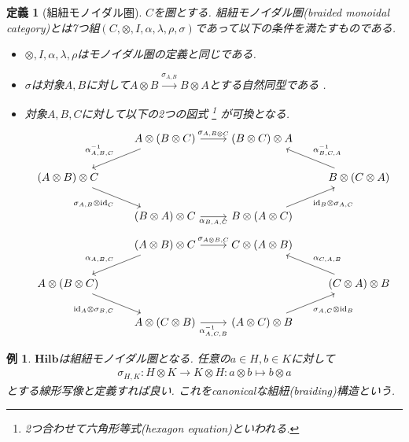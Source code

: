 \documentclass[a4paper,12pt]{ltjsarticle}
\theoremstyle{break}
\newtheorem{defn}[thm]{定義}
\newtheorem{eg}[thm]{例}
\newcommand{\hilb}{\mathbf{Hilb}}
\newcommand{\xr}[1]{\xrightarrow{#1}}
\newcommand{\id}{\mathrm{id}}
\newcommand{\al}{\alpha}
\newcommand{\la}{\lambda}
\newcommand{\si}{\sigma}
\newcommand{\mt}{\mapsto}
\newcommand{\ot}{\otimes}
\numberwithin{equation}{section}
\begin{document}
\begin{defn}[組紐モノイダル圏]
  $C$を圏とする. 組紐モノイダル圏(braided monoidal category)とは7つ組$(C,\ot,I,\al,\la,\rho,\si)$であって以下の条件を満たすものである. 
  \begin{itemize}
    \item $\ot,I,\al,\la,\rho$はモノイダル圏の定義と同じである. 
    \item $\si$は対象$A,B$に対して$A \ot B \xr{\si_{A,B}} B \ot A$とする自然同型である . 
    \item 対象$A,B,C$に対して以下の2つの図式
    \footnote{
      2つ合わせて六角形等式(hexagon equation)といわれる. 
    }
    が可換となる.
    \[\begin{tikzcd}
      & {A \ot (B \ot C)} & {(B \ot C)\ot A} \\
      {(A \ot B) \ot C} &&& {B \ot (C \ot A)} \\
      & {(B \ot A) \ot C} & {B \ot (A \ot C)}
      \arrow["{\al_{A,B,C}^{-1}}"', from=1-2, to=2-1]
      \arrow["{\si_{A,B \ot C}}", from=1-2, to=1-3]
      \arrow["{\al_{B,C,A}^{-1}}"', from=2-4, to=1-3]
      \arrow["{\id_{B} \ot \si_{A,C}}"', from=3-3, to=2-4]
      \arrow["{\si_{A,B} \ot \id_C}"', from=2-1, to=3-2]
      \arrow["{\al_{B,A,C}}"', from=3-2, to=3-3]
    \end{tikzcd}\]
    \[\begin{tikzcd}
      & {(A \ot B) \ot C} & {C \ot (A \ot B)} \\
      {A \ot (B \ot C)} &&& {(C \ot A) \ot B} \\
      & {A \ot (C \ot B)} & {(A \ot C) \ot B}
      \arrow["{\al_{A,B,C}}"', from=1-2, to=2-1]
      \arrow["{\si_{A \ot B, C}}", from=1-2, to=1-3]
      \arrow["{\al_{C,A,B}}"', from=2-4, to=1-3]
      \arrow["{\si_{A,C} \ot \id_B}"', from=3-3, to=2-4]
      \arrow["{\id_A \ot \si_{B,C}}"', from=2-1, to=3-2]
      \arrow["{\al_{A,C,B}^{-1}}"', from=3-2, to=3-3]
    \end{tikzcd}\]
  \end{itemize}
\end{defn}   

\begin{eg}
  $\hilb$は組紐モノイダル圏となる. 
  任意の$a \in H, b \in K$に対して
  \begin{align*}
    \si_{H,K}: H \ot K \to K \ot H: a \ot b \mt b \ot a
  \end{align*}
  とする線形写像と定義すれば良い.  
  これをcanonicalな組紐(braiding)構造という. 
\end{eg}
\end{document}
